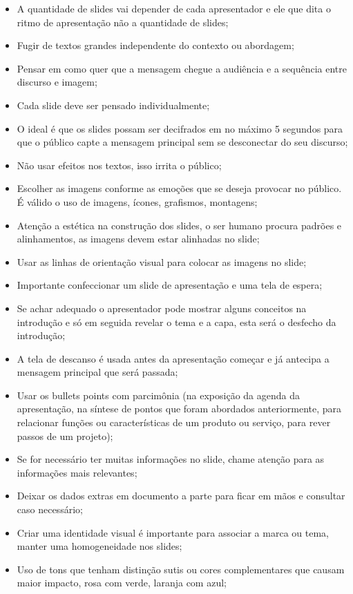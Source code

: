 \begin{itemize}
    \item A quantidade de slides vai depender de cada apresentador e ele que dita o ritmo de apresentação não a quantidade de slides;
    \item Fugir de textos grandes independente do contexto ou abordagem;
    \item Pensar em como quer que a mensagem chegue a audiência e a sequência entre discurso e imagem;
    \item Cada slide deve ser pensado individualmente;
    \item O ideal é que os slides possam ser decifrados em no máximo 5 segundos para que o público capte a mensagem principal sem se desconectar do seu discurso;
    \item Não usar efeitos nos textos, isso irrita o público;
    \item Escolher as imagens conforme as emoções que se deseja provocar no público. É válido o uso de imagens, ícones, grafismos, montagens;
    \item Atenção a estética na construção dos slides, o ser humano procura padrões e alinhamentos, as imagens devem estar alinhadas no slide;
    \item Usar as linhas de orientação visual para colocar as imagens no slide;
    \item Importante confeccionar um slide de apresentação e uma tela de espera;
    \item Se achar adequado o apresentador pode mostrar alguns conceitos na introdução e só em seguida revelar o tema e a capa, esta será o desfecho da introdução;
    \item A tela de descanso é usada antes da apresentação começar e já antecipa a mensagem principal que será passada;
    \item Usar os bullets points com parcimônia (na exposição da agenda da apresentação, na síntese de pontos que foram abordados anteriormente, para relacionar funções ou características de um produto ou serviço, para rever passos de um projeto);
    \item Se for necessário ter muitas informações no slide, chame atenção para as informações mais relevantes;
    \item Deixar os dados extras em documento a parte para ficar em mãos e consultar caso necessário;
    \item Criar uma identidade visual é importante para associar a marca ou tema, manter uma homogeneidade nos slides;
    \item Uso de tons que tenham distinção sutis ou cores complementares que causam maior impacto, rosa com verde, laranja com azul;

\end{itemize}
